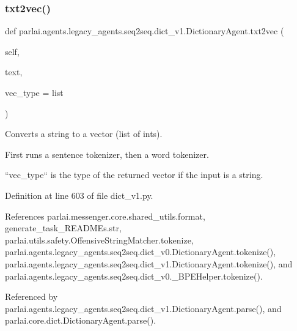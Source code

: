 \subsubsection{\texorpdfstring{txt2vec()}{txt2vec()}}
{\footnotesize\ttfamily def parlai.\+agents.\+legacy\+\_\+agents.\+seq2seq.\+dict\+\_\+v1.\+Dictionary\+Agent.\+txt2vec (\begin{DoxyParamCaption}\item[{}]{self,  }\item[{}]{text,  }\item[{}]{vec\+\_\+type = {\ttfamily list} }\end{DoxyParamCaption})}

\begin{DoxyVerb}Converts a string to a vector (list of ints).

First runs a sentence tokenizer, then a word tokenizer.

``vec_type`` is the type of the returned vector if the input is a string.
\end{DoxyVerb}
 

Definition at line 603 of file dict\+\_\+v1.\+py.



References parlai.\+messenger.\+core.\+shared\+\_\+utils.\+format, generate\+\_\+task\+\_\+\+R\+E\+A\+D\+M\+Es.\+str, parlai.\+utils.\+safety.\+Offensive\+String\+Matcher.\+tokenize, parlai.\+agents.\+legacy\+\_\+agents.\+seq2seq.\+dict\+\_\+v0.\+Dictionary\+Agent.\+tokenize(), parlai.\+agents.\+legacy\+\_\+agents.\+seq2seq.\+dict\+\_\+v1.\+Dictionary\+Agent.\+tokenize(), and parlai.\+agents.\+legacy\+\_\+agents.\+seq2seq.\+dict\+\_\+v0.\+\_\+\+B\+P\+E\+Helper.\+tokenize().



Referenced by parlai.\+agents.\+legacy\+\_\+agents.\+seq2seq.\+dict\+\_\+v1.\+Dictionary\+Agent.\+parse(), and parlai.\+core.\+dict.\+Dictionary\+Agent.\+parse().

